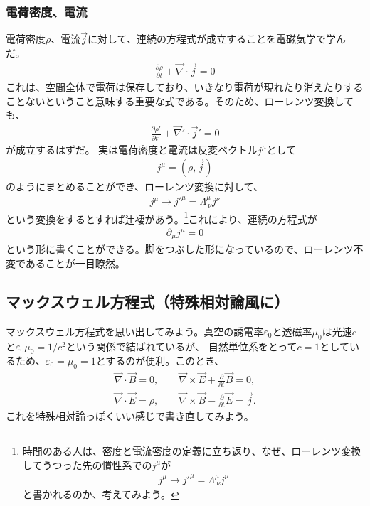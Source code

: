 \documentclass[10pt,a4paper]{jarticle}
\begin{document}
\subsubsection{電荷密度、電流}
電荷密度$\rho$、電流$\vec j$に対して、連続の方程式が成立することを電磁気学で学んだ。
\begin{align}
\frac{\partial \rho}{\partial t} + \vec\nabla \cdot \vec j = 0
\end{align}
これは、空間全体で電荷は保存しており、いきなり電荷が現れたり消えたりすることないということ意味する重要な式である。そのため、ローレンツ変換しても、
\begin{align}
\frac{\partial \rho'}{\partial t'} + \vec\nabla' \cdot \vec j' = 0
\end{align}
が成立するはずだ。
実は電荷密度と電流は反変ベクトル$j^\mu$として
\begin{align}
j^\mu = (\rho, \vec j)
\end{align}
のようにまとめることができ、ローレンツ変換に対して、
\begin{align}
j^\mu \to j'^\mu = \Lambda^\mu_{~\nu} j^\nu
\end{align}
という変換をするとすれば辻褄があう。\footnote{
時間のある人は、密度と電流密度の定義に立ち返り、なぜ、ローレンツ変換してうつった先の慣性系での$j^\mu$が
\begin{align}
j^\mu \to j'^\mu = \Lambda^\mu_{~\nu} j^\nu
\end{align}
と書かれるのか、考えてみよう。}これにより、連続の方程式が
\begin{align}
\partial_\mu j^\mu = 0
\end{align}
という形に書くことができる。脚をつぶした形になっているので、ローレンツ不変であることが一目瞭然。


\subsection{マックスウェル方程式（特殊相対論風に）}
マックスウェル方程式を思い出してみよう。真空の誘電率$\varepsilon_0$と透磁率$\mu_0$は光速$c$と$\varepsilon_0 \mu_0 = 1/c^2$という関係で結ばれているが、
自然単位系をとって$c=1$としているため、$\varepsilon_0 = \mu_0 = 1$とするのが便利。このとき、
\begin{align}
\vec\nabla \cdot \vec B = 0, \qquad
\vec\nabla \times \vec E + \frac{\partial}{\partial t}\vec B = 0, \label{eq:bianchi}\\
\vec\nabla \cdot \vec E = \rho, \qquad
\vec\nabla \times \vec B - \frac{\partial}{\partial t} \vec E = \vec j. \label{eq:maxwell}
\end{align}
これを特殊相対論っぽくいい感じで書き直してみよう。
\end{document}
